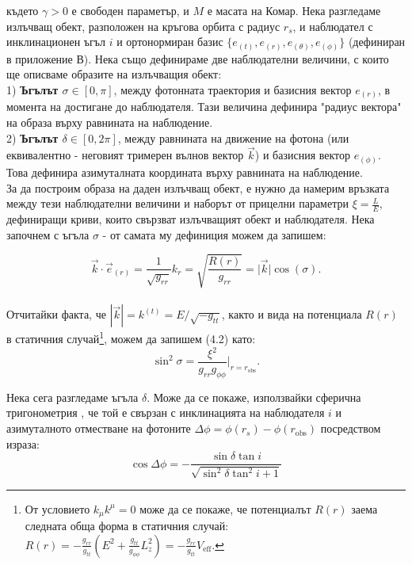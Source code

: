 \documentclass[12pt]{article}
\numberwithin{equation}{section}
\numberwithin{figure}{section}
\begin{document}
	\noindent където $\gamma > 0$ е свободен параметър, и $M$ е масата на Комар. Нека разгледаме излъчващ обект, разположен на кръгова орбита с радиус $r_s$, и наблюдател с инклинационен ъгъл $i$ и ортонормиран базис $\{e_{(t)}, e_{(r)}, e_{(\theta)}, e_{(\phi)}\}$ (дефиниран в приложение В). Нека също дефинираме две наблюдателни величини, с които ще описваме образите на излъчващия обект:\\
	
	1) \textbf{Ъгълът $\sigma\in[0,\pi]$}, между фотонната траектория и базисния вектор $e_{(r)}$, в момента на достигане до наблюдателя. Тази величина дефинира "радиус вектора" на образа върху равнината на наблюдение.\\
	
	2) \textbf{Ъгълът $\delta\in[0,2\pi]$}, между равнината на движение на фотона (или еквивалентно - неговият тримерен вълнов вектор $\vec{k}$) и базисния вектор $e_{(\phi)}$. Това дефинира азимуталната координата върху равнината на наблюдение.\\
	
	За да построим образа на даден излъчващ обект, е нужно да намерим връзката между тези наблюдателни величини и наборът от прицелни параметри $\xi = \frac{L}{E}$, дефиниращи криви, които свързват излъчващият обект и наблюдателя. Нека започнем с ъгъла $\sigma$ - от самата му дефиниция можем да запишем:
	
	\begin{equation}
		\vec{k} \cdot \vec{e}_{(r)} = \frac{1}{\sqrt{g_{rr}}}k_{r} = \sqrt{\frac{R(r)}{g_{rr}}} =  \big\vert \vec{k}\big\vert \cos(\sigma).
	\end{equation}\\
	Отчитайки факта, че $|\vec{k}| = k^{(t)} = E/\sqrt{-g_{tt}}$, както и вида на потенциала $R(r)$ в статичния случай\footnote{От условието $k_\mu k^\mu = 0$ може да се покаже, че потенциалът $R(r)$ заема следната обща форма в статичния случай: $R(r) = -\frac{g_{rr}}{g_{tt}}\left(E^2 + \frac{g_{tt}}{g_{\phi\phi}}L_z^2\right) = -\frac{g_{rr}}{g_{tt}} V_\text{eff}$.}, можем да запишем (4.2) като:
	\begin{equation}
		\sin^2\sigma = \frac{\xi^2}{g_{rr}g_{\phi\phi}}\bigg\vert_{r = r_\text{obs}}.
	\end{equation}
	
	Нека сега разгледаме ъгъла $\delta$. Може да се покаже, използвайки сферична тригонометрия \cite{Luminet1979}, че той е свързан с инклинацията на наблюдателя $i$ и азимуталното отместване на фотоните $\Delta\phi = \phi(r_s) - \phi(r_\text{obs})$ посредством израза:
	\begin{equation}
		\cos\Delta\phi = - \frac{\sin\delta\tan i}{\sqrt{\sin^2\delta\tan^2 i + 1}}
	\end{equation}
	
\end{document}
